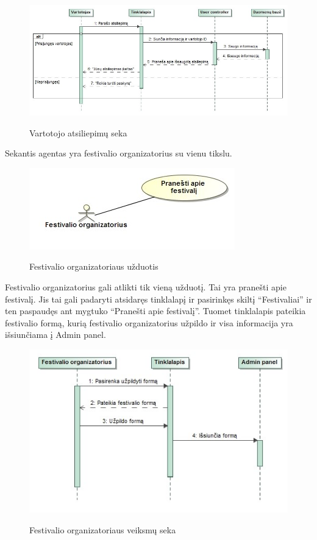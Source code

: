 ﻿\documentclass{VUMIFPSkursinis}
\begin{document}
\begin{figure}[H]
    \centering
    \includegraphics[scale=0.5]{img/Pav/VartotojasAtsiliepimas}
    \label{img:uml6}
	\caption{Vartotojo atsiliepimų seka}
\end{figure}	
	
Sekantis agentas yra festivalio organizatorius su vienu tikslu.

\begin{figure}[H]
    \centering
    \includegraphics[scale=0.5]{img/Pav/FestivalioOrg}
    \label{img:uml7}
	\caption{Festivalio organizatoriaus užduotis}
\end{figure}	
	
Festivalio organizatorius gali atlikti tik vieną užduotį. Tai yra pranešti apie festivalį. Jis tai gali padaryti atsidaręs tinklalapį ir pasirinkęs skiltį “Festivaliai” ir ten paspaudęs ant mygtuko “Pranešti apie festivalį”. Tuomet tinklalapis pateikia festivalio formą, kurią festivalio organizatorius užpildo ir visa informacija yra išsiunčiama į Admin panel.

\begin{figure}[H]
    \centering
    \includegraphics[scale=0.5]{img/Pav/FestivalOrgPranesti}
    \label{img:uml8}
	\caption{Festivalio organizatoriaus veiksmų seka}
\end{figure}	
\end{document}
